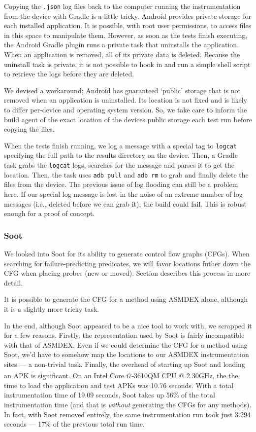 Copying the {\tt .json} log files back to the computer running the instrumentation from the device with Gradle is a little tricky. Android provides private storage for each installed application. It is possible, with root user permissions, to access files in this space to manipulate them. However, as soon as the tests finish executing, the Android Gradle plugin runs a private task that uninstalls the application. When an application is removed, all of its private data is deleted. Because the uninstall task is private, it is not possible to hook in and run a simple shell script to retrieve the logs before they are deleted.

We devised a workaround; Android has guaranteed {\lq}public{\rq} storage that is not removed when an application is uninstalled. Its location is not fixed and is likely to differ per-device and operating system version. So, we take care to inform the build agent of the exact location of the devices public storage each test run before copying the files.

When the tests finish running, we log a message with a special tag to {\tt logcat} specifying the full path to the results directory on the device. Then, a Gradle task grabs the {\tt logcat} logs, searches for the message and parses it to get the location. Then, the task uses {\tt adb pull} and {\tt adb rm} to grab and finally delete the files from the device. The previous issue of log flooding can still be a problem here. If our special log message is lost in the noise of an extreme number of log messages (i.e., deleted before we can grab it), the build could fail. This is robust enough for a proof of concept.

\subsubsection{Soot}

We looked into Soot for its ability to generate control flow graphs (CFGs). When searching for failure-predicting predicates, we will favor locations futher down the CFG when placing probes (new or moved). Section  describes this process in more detail.

It is possible to generate the CFG for a method using ASMDEX alone, although it is a slightly more tricky task.

In the end, although Soot appeared to be a nice tool to work with, we scrapped it for a few reasons. Firstly, the representation used by Soot is fairly incompatible with that of ASMDEX. Even if we could determine the CFG for a method using Soot, we'd have to somehow map the locations to our ASMDEX instrumentation sites --- a non-trivial task. Finally, the overhead of starting up Soot and loading an APK is significant. On an Intel\textsuperscript{\textregistered} Core\textsuperscript{\texttrademark} i7-3610QM CPU @ 2.30GHz, the the time to load the application and test APKs was 10.76 seconds. With a total instrumentation time of 19.09 seconds, Soot takes up 56\% of the total instrumentation time (and that is \textit{without} generating the CFGs for any methods). In fact, with Soot removed entirely, the same instrumentation run took just 3.294 seconds --- 17\% of the previous total run time.

